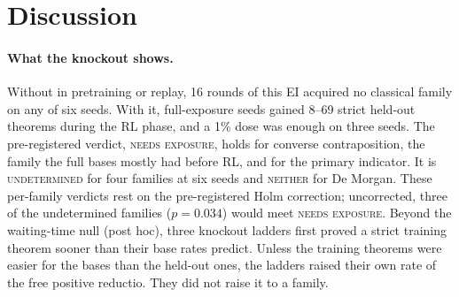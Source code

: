 \section{Discussion}
\label{sec:discussion}

\paragraph{What the knockout shows.} Without \sig{} in pretraining or replay, 16 rounds of this EI acquired no classical
family on any of six seeds. With it, full-exposure seeds gained 8--69 strict held-out theorems during the RL phase, and a
1\% dose was enough on three seeds. The pre-registered verdict, \textsc{needs exposure}, holds for converse
contraposition, the family the full bases mostly had before RL, and for the primary indicator. It is
\textsc{undetermined} for four families at six seeds and \textsc{neither} for De Morgan. These per-family verdicts
rest on the pre-registered Holm correction; uncorrected, three of the undetermined families ($p = 0.034$) would meet
\textsc{needs exposure}. Beyond the waiting-time null
(post hoc), three knockout ladders first proved a strict training theorem sooner than their base rates predict. Unless the
training theorems were easier for the bases than the held-out ones, the ladders raised their own rate of the free
positive reductio. They did not raise it to a family.

